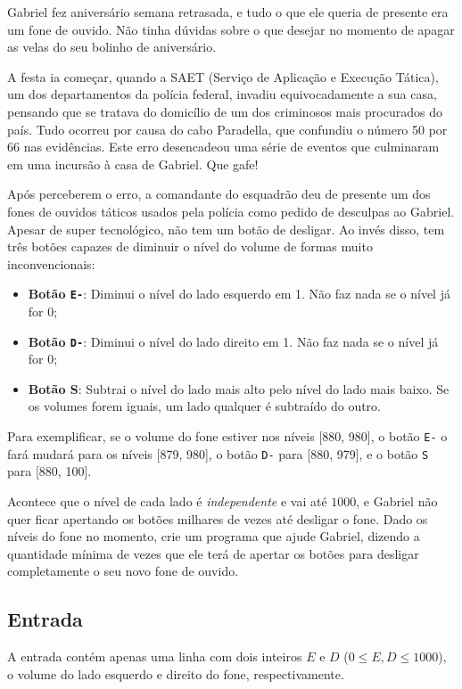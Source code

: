 Gabriel fez aniversário semana retrasada, e tudo o que ele queria de presente era um fone de ouvido. Não tinha dúvidas sobre o que desejar no momento de apagar as velas do seu bolinho de aniversário. 

A festa ia começar, quando a SAET (Serviço de Aplicação e Execução Tática), um dos departamentos da polícia federal, invadiu equivocadamente a sua casa, pensando que se tratava do domicílio de um dos criminosos mais procurados do país. Tudo ocorreu por causa do cabo Paradella, que confundiu o número 50 por 66 nas evidências. Este erro desencadeou uma série de eventos que culminaram em uma incursão à casa de Gabriel. Que gafe!

Após perceberem o erro, a comandante do esquadrão deu de presente um dos fones de ouvidos táticos usados pela polícia como pedido de desculpas ao Gabriel. Apesar de super tecnológico, não tem um botão de desligar. Ao invés disso, tem três botões capazes de diminuir o nível do volume de formas muito inconvencionais:

\begin{itemize}
\item \textbf{Botão \texttt{E-}}: Diminui o nível do lado esquerdo em 1. Não faz nada se o nível já for 0;
\item \textbf{Botão \texttt{D-}}: Diminui o nível do lado direito em 1. Não faz nada se o nível já for 0;
\item \textbf{Botão S}: Subtrai o nível do lado mais alto pelo nível do lado mais baixo. Se os volumes forem iguais, um lado qualquer é subtraído do outro.
\end{itemize}

Para exemplificar, se o volume do fone estiver nos níveis [880, 980], o botão \texttt{E-} o fará mudará para os níveis [879, 980], o botão \texttt{D-} para [880, 979], e o botão \texttt{S} para [880, 100].

Acontece que o nível de cada lado é \textit{independente} e vai até $1000$, e Gabriel não quer ficar apertando os botões milhares de vezes até desligar o fone. Dado os níveis do fone no momento, crie um programa que ajude Gabriel, dizendo a quantidade mínima de vezes que ele terá de apertar os botões para desligar completamente o seu novo fone de ouvido.

\subsection*{Entrada}
A entrada contém apenas uma linha com dois inteiros $E$ e $D$ ($0 \leq E, D \leq 1000$), o volume do lado esquerdo e direito do fone, respectivamente.

